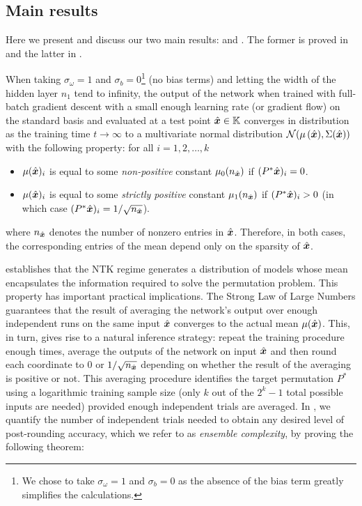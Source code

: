 \subsection{Main results}
Here we present and discuss our two main results:  and . The former is proved in  and the latter in .
\begin{theorem}
\label{thm:mean_useful}
    When taking $\sigma_\omega = 1$ and $\sigma_b = 0$\footnote{We chose to take $\sigma_\omega = 1$ and $\sigma_b = 0$ as the absence of the bias term greatly simplifies the calculations.} (no bias terms) and letting the width of the hidden layer $n_1$ tend to infinity, the output of the network when trained with full-batch gradient descent with a small enough learning rate (or gradient flow) on the standard basis and evaluated at a test point $\hat{\boldsymbol{x}} \in \mathbb{K}$ converges in distribution as the training time $t\to \infty$ to a multivariate normal distribution $\mathcal{N}(\mu\left(\hat{\boldsymbol{x}}), \Sigma(\hat{\boldsymbol{x}})\right)$ with the following property: for all $i=1,2,\dots, k$ 
\begin{itemize}
    \item $\mu(\hat{\boldsymbol{x}})_i$ is equal to some \textit{non-positive} constant $\mu_0(n_{\hat{\boldsymbol{x}}})$ if $(P^* \hat{\boldsymbol{x}})_i = 0$.
    \item $\mu(\hat{\boldsymbol{x}})_i$ is equal to some \textit{strictly positive} constant $\mu_1(n_{\hat{\boldsymbol{x}}})$ if $(P^* \hat{\boldsymbol{x}})_i > 0$ (in which case $(P^* \hat{\boldsymbol{x}})_i = 1/\sqrt{n_{\hat{\boldsymbol{x}}}}$).
\end{itemize}
where $n_{\hat{\boldsymbol{x}}}$ denotes the number of nonzero entries in $\hat{\boldsymbol{x}}$. Therefore, in both cases, the corresponding entries of the mean depend only on the sparsity of $\hat{\boldsymbol{x}}$.
\end{theorem}

 establishes that the NTK regime generates a distribution of models whose mean encapsulates the information required to solve the permutation problem. This property has important practical implications. The Strong Law of Large Numbers guarantees that the result of averaging the network's output over enough independent runs on the same input $\hat{\boldsymbol{x}}$ converges to the actual mean $\mu(\hat{\boldsymbol{x}})$. This, in turn, gives rise to a natural inference strategy: repeat the training procedure enough times, average the outputs of the network on input $\hat{\boldsymbol{x}}$ and then round each coordinate to $0$ or $1/\sqrt{n_{\hat{\boldsymbol{x}}}}$ depending on whether the result of the averaging is positive or not.
%
%
This averaging procedure identifies the target permutation $P^*$ using a logarithmic training sample size (only $k$ out of the $2^k - 1$ total possible inputs are needed) provided enough independent trials are averaged.
In , we quantify the number of independent trials needed to obtain any desired level of post-rounding accuracy, which we refer to as  \textit{ensemble complexity}, by proving the following theorem:

